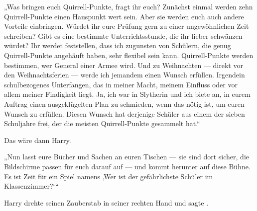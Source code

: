 „Was bringen euch Quirrell-Punkte, fragt ihr euch? Zunächst einmal werden zehn Quirrell-Punkte einen Hauspunkt wert sein. Aber sie werden euch auch andere Vorteile einbringen. Würdet ihr eure Prüfung gern zu einer ungewöhnlichen Zeit schreiben? Gibt es eine bestimmte Unterrichtsstunde, die ihr lieber schwänzen würdet? Ihr werdet feststellen, dass ich zugunsten von Schülern, die genug Quirrell-Punkte angehäuft haben, sehr flexibel sein kann. Quirrell-Punkte werden bestimmen, wer General einer Armee wird. Und zu Weihnachten — direkt vor den Weihnachtsferien — werde ich jemandem einen Wunsch erfüllen. Irgendein schulbezogenes Unterfangen, das in meiner Macht, meinem Einfluss oder vor allem meiner Findigkeit liegt. Ja, ich war in Slytherin und ich biete an, in eurem Auftrag einen ausgeklügelten Plan zu schmieden, wenn das nötig ist, um euren Wunsch zu erfüllen. Diesen Wunsch hat derjenige Schüler aus einem der sieben Schuljahre frei, der die meisten Quirrell-Punkte gesammelt hat.“

Das wäre dann Harry.

„Nun lasst eure Bücher und Sachen an euren Tischen — sie sind dort sicher, die Bildschirme passen für euch darauf auf — und kommt herunter auf diese Bühne. Es ist Zeit für ein Spiel namens ‚Wer ist der gefährlichste Schüler im Klassenzimmer?‘“

\later

Harry drehte seinen Zauberstab in seiner rechten Hand und sagte .

